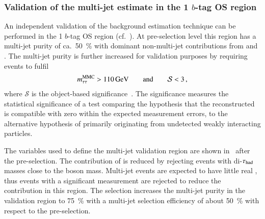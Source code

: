 \subsubsection{Validation of the multi-jet estimate in the 1 $b$-tag OS region}

An independent validation of the background estimation technique can
be performed in the 1 $b$-tag OS region (cf.\
).
At pre-selection level this region has a multi-jet purity of ca.\
\SI{50}{\percent} with dominant non-multi-jet contributions from
\Zjets and \ttbar. The multi-jet purity is further increased for
validation purposes by requiring events to fulfil
\begin{align*}
  m_{\tau\tau}^\text{MMC} > \SI{110}{\ensuremath{\text{GeV}}} \qquad \text{and} \qquad \mathcal{S} < 3 \,\text{,}
\end{align*}
where $\mathcal{S}$ is the object-based \pTmissAbs
significance~\cite{ATLAS-CONF-2018-038}. The \pTmissAbs significance
measures the statistical significance of a test comparing the
hypothesis that the reconstructed \pTmissAbs is compatible with zero
within the expected measurement errors, to the alternative hypothesis
of \pTmissAbs primarily originating from undetected weakly interacting
particles.

The variables used to define the multi-jet validation region are shown
in~ after the pre-selection. The
contribution of \Zjets is reduced by rejecting events with di-$\tau_{\text{had}}$
masses close to the \PZ boson mass.  Multi-jet events are expected to
have little real \pTmissAbs, thus events with a significant \pTmissAbs
measurement are rejected to reduce the \ttbar contribution in this
region. The selection increases the multi-jet purity in the validation
region to \SI{75}{\percent} with a multi-jet selection efficiency of
about \SI{50}{\percent} with respect to the pre-selection.

